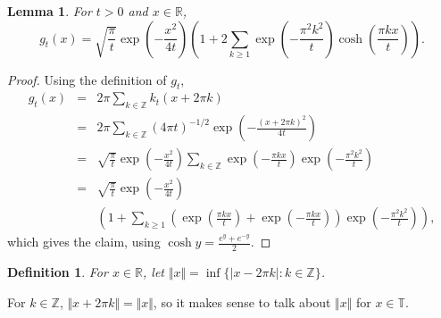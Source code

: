 \documentclass{article}
\newcommand{\norm}[1]{\Vert #1 \Vert}
\newtheorem{lemma}[theorem]{Lemma}
\newtheorem{definition}[theorem]{Definition}
\begin{document}
\begin{lemma}
For $t>0$ and $x \in \mathbb{R}$,
\[
g_t(x)=\sqrt{\frac{\pi}{t}} \exp\left(-\frac{x^2}{4t} \right) \left(1+2\sum_{k \geq 1} \exp\left(-\frac{\pi^2 k^2}{t}\right) \cosh\left(\frac{\pi k x}{t} \right) \right).
\]
\label{coshlemma}
\end{lemma}
\begin{proof}
Using the definition of $g_t$,
\begin{eqnarray*}
g_t(x)&=&2\pi \sum_{k \in \mathbb{Z}} k_t(x+2\pi k)\\
&=&2\pi \sum_{k \in \mathbb{Z}} (4\pi t)^{-1/2} \exp\left(-\frac{(x+2\pi k)^2}{4t}\right)\\
&=&\sqrt{\frac{\pi}{t}} \exp\left(-\frac{x^2}{4t} \right) \sum_{k \in \mathbb{Z}} \exp\left(-\frac{\pi k x}{t}\right) \exp\left(-\frac{\pi^2 k^2}{t}\right)\\
&=&\sqrt{\frac{\pi}{t}} \exp\left(-\frac{x^2}{4t} \right)\\
&&\left( 1+ \sum_{k \geq 1} \left( \exp\left(\frac{\pi k x}{t}\right) + \exp\left(-\frac{\pi k x}{t}\right)\right)  \exp\left(-\frac{\pi^2 k^2}{t}\right)   \right),
\end{eqnarray*}
which gives the claim, using $\cosh y = \frac{e^y + e^{-y}}{2}$.
\end{proof}

\begin{definition}
For $x \in \mathbb{R}$, let $\norm{x}=\inf\{|x-2\pi k|:k \in \mathbb{Z}\}$.
\end{definition}

 For $k \in \mathbb{Z}$, $\norm{x+2\pi k}=\norm{x}$, so
it makes sense to talk about $\norm{x}$ for $x \in \mathbb{T}$. 
\end{document}
